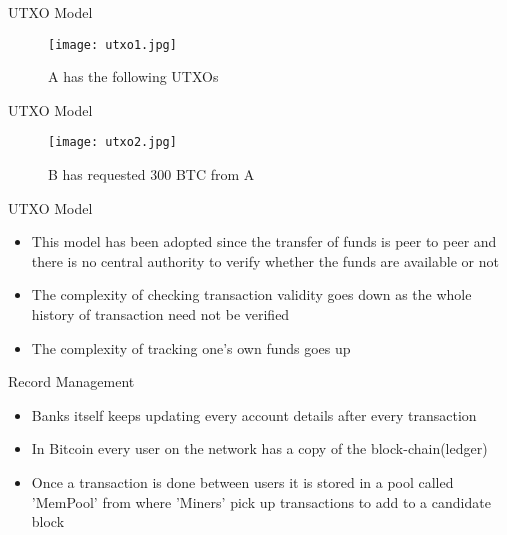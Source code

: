 \documentclass{beamer}
\begin{document}
\begin{frame}{UTXO Model}
 \begin{figure}[H]\centering 
\texttt{[image: utxo1.jpg]}
\caption{A has the following UTXOs}
\end{figure}   
\end{frame}
\begin{frame}{UTXO Model}
 \begin{figure}[H]\centering 
\texttt{[image: utxo2.jpg]}
\caption{B has requested 300 BTC from A}
\end{figure}   
\end{frame}
\begin{frame}{UTXO Model}
\begin{itemize}
    \item This model has been adopted since the transfer of funds is peer to peer and there is no central
authority to verify whether the funds are available or not
\item The complexity of checking transaction validity goes down as the whole history of transaction need not
be verified
\item The complexity of tracking one’s own funds goes up
\end{itemize}
    
\end{frame}
\begin{frame}{Record Management}
 \begin{itemize}
     \item Banks itself keeps updating every account details after every transaction
     \item In Bitcoin every user on the network has a copy of the block-chain(ledger)
     \item Once a transaction is done between users it is stored in a pool called 'MemPool' from where 'Miners' pick up transactions to add to a candidate block 
 \end{itemize} 
 \end{frame}
 
 
\end{document}
